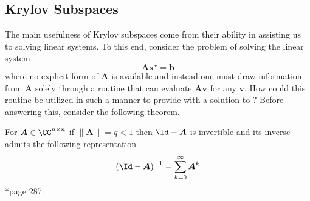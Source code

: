 
\subsection{Krylov Subspaces}\label{Section4.1}

The main usefulness of Krylov subspaces come from their ability in assisting us to solving linear systems. To this end, consider the problem of solving the linear system
\begin{equation}\label{eq: lin_sys_1}
    \bm{A} \bm{x^{\star}} = \bm{b}
\end{equation}
where no explicit form of $\bm{A}$ is available and instead one must draw information from $\bm{A}$ solely through a routine that can evaluate $\bm{A} \bm{v}$ for any $\bm{v}$. How could this routine be utilized in such a manner to provide with a solution to ? Before answering this, consider the following theorem.

\begin{thm} \label{theorem: invert_mat_norm}
    For $\bm{A} \in \CC^{n \times n}$ if $\| \bm{A} \| = q < 1$ then $\Id - \bm{A}$ is invertible and its inverse admits the following representation
    \begin{equation*} \label{eq: convg-of-part}
        \left( \Id - \bm{A} \right)^{-1} = \sum_{k=0}^{\infty} \bm{A}^k
    \end{equation*}
    \cite{BerezanskyMakarovich1996FaV1}*{page 287}.
\end{thm}

